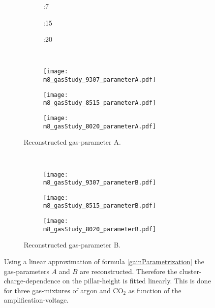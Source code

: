 \documentclass[
twoside,            %
BCOR1.4cm,          %
10pt,               %
headings=normal,    %
headsepline,        %
clearplainpage,		%
final,              %
div=14,
open=right,
bibliography=toc
]{scrreprt}
\begin{document}
\begin{figure}[!h]
	\begin{subfigure}[b]{\textwidth}
		\begin{subfigure}[b]{0.32\textwidth}
			:7
		\end{subfigure}
		\hfill
		\begin{subfigure}[b]{0.32\textwidth}
			:15
		\end{subfigure}
		\hfill
		\begin{subfigure}[b]{0.32\textwidth}
			:20
		\end{subfigure}
	\end{subfigure}
	\vspace{2mm}
	\\
	\begin{subfigure}[b]{\textwidth}
		\begin{subfigure}[b]{0.32\textwidth}
			\centering
			\texttt{[image: m8\_gasStudy\_9307\_parameterA.pdf]}
		\end{subfigure}
		\hfill
		\begin{subfigure}[b]{0.32\textwidth}
			\centering
			\texttt{[image: m8\_gasStudy\_8515\_parameterA.pdf]}
		\end{subfigure}
		\hfill
		\begin{subfigure}[b]{0.32\textwidth}
			\centering
			\texttt{[image: m8\_gasStudy\_8020\_parameterA.pdf]}
		\end{subfigure}
		\caption{
			Reconstructed gas-parameter A.
		}
	\end{subfigure}
	\vspace{2mm}
	\\
	\begin{subfigure}[b]{\textwidth}
		\begin{subfigure}[b]{0.32\textwidth}
			\centering
			\texttt{[image: m8\_gasStudy\_9307\_parameterB.pdf]}
		\end{subfigure}
		\hfill
		\begin{subfigure}[b]{0.32\textwidth}
			\centering
			\texttt{[image: m8\_gasStudy\_8515\_parameterB.pdf]}
		\end{subfigure}
		\hfill
		\begin{subfigure}[b]{0.32\textwidth}
			\centering
			\texttt{[image: m8\_gasStudy\_8020\_parameterB.pdf]}
		\end{subfigure}
		\caption{
			Reconstructed gas-parameter B.
		}
	\end{subfigure}
	\vspace{-4mm}
	\caption{
		Using a linear approximation of formula \ref{gainParametrization} the gas-parameters $A$ and $B$ are reconstructed.
		Therefore the cluster-charge-dependence on the pillar-height is fitted linearly.
		This is done for three gas-mixtures of argon and CO$_2$ as function of the amplification-voltage.
	}
	\label{gasParameterDependencies} 
\end{figure}
\end{document}
